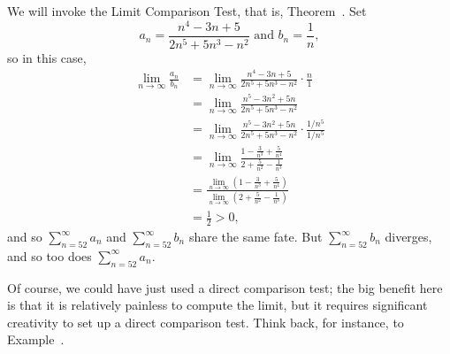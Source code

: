 \begin{solution}
  We will invoke the Limit Comparison Test, that is,
  Theorem~.  Set
  $$
a_n = \frac{n^4 - 3n + 5}{2n^5 + 5n^3 - n^2} \mbox{ and }
b_n = \frac{1}{n},
  $$
so in this case,
\begin{align*}
\lim_{n \to \infty} \frac{a_n}{b_n} &= \lim_{n \to \infty}  \frac{n^4 - 3n + 5}{2n^5 + 5n^3 - n^2} \cdot \frac{n}{1} \\
&= \lim_{n \to \infty}  \frac{n^5 - 3n^2 + 5n}{2n^5 + 5n^3 - n^2} \\
&= \lim_{n \to \infty}  \frac{n^5 - 3n^2 + 5n}{2n^5 + 5n^3 - n^2} \cdot \frac{1/n^5}{1/n^5} \\
&= \lim_{n \to \infty}  \frac{1 - \frac{3}{n^3} + \frac{5}{n^4}}{2 + \frac{5}{n^2} - \frac{1}{n^3}} \\
&= \frac{\lim_{n\to\infty} \left(1 - \frac{3}{n^3} + \frac{5}{n^4}\right)}{\lim_{n \to \infty} \left(2 + \frac{5}{n^2} - \frac{1}{n^3}\right)} \\
&= \frac{1}{2} > 0,
\end{align*}
and so $\sum_{n=52}^\infty a_n$ and $\sum_{n=52}^\infty b_n$ share the same fate.  But $\sum_{n=52}^\infty b_n$ diverges, and so too does $\sum_{n=52}^\infty a_n$.
\end{solution}

Of course, we could have just used a direct comparison test; the big
benefit here is that it is relatively painless to compute the limit,
but it requires significant creativity to set up a direct comparison
test.  Think back, for instance, to
Example~.
